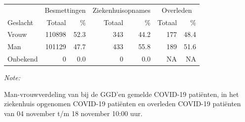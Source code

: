 \documentclass[
  english,
  man,floatsintext]{apa6}
\begin{document}
\begin{table}
\centering\begingroup\fontsize{11}{13}\selectfont

\begin{threeparttable}
\begin{tabular}{lrrrrrr}
\toprule
\multicolumn{1}{c}{ } & \multicolumn{2}{c}{Besmettingen} & \multicolumn{2}{c}{Ziekenhuisopnames} & \multicolumn{2}{c}{Overleden} \\
\cmidrule(l{3pt}r{3pt}){2-3} \cmidrule(l{3pt}r{3pt}){4-5} \cmidrule(l{3pt}r{3pt}){6-7}
Geslacht & Totaal & \% & Totaal & \% & Totaal & \%\\
\midrule
Vrouw & 110898 & 52.3 & 343 & 44.2 & 177 & 48.4\\
Man & 101129 & 47.7 & 433 & 55.8 & 189 & 51.6\\
Onbekend & 0 & 0.0 & 0 & 0.0 & NA & NA\\
\bottomrule
\end{tabular}
\begin{tablenotes}
\item \textit{Note: } 
\item Man-vrouwverdeling van bij de GGD’en gemelde COVID-19 patiënten, in het ziekenhuis opgenomen COVID-19 patiënten en overleden COVID-19 patiënten van 04 november t/m 18 november 10:00 uur.
\end{tablenotes}
\end{threeparttable}
\endgroup{}
\end{table}
\newpage
\end{document}
